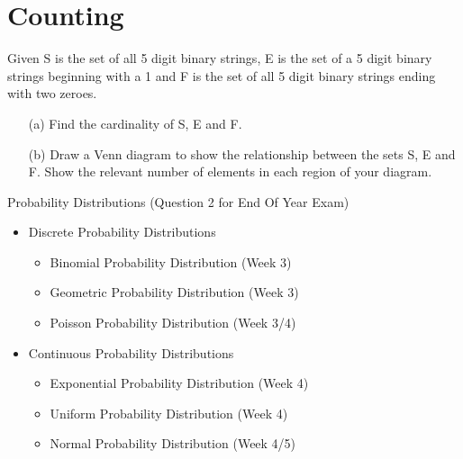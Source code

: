 \documentclass[12pt]{report}
\begin{document}
	
\section{Counting}
Given S is the set of all 5 digit binary strings, E is the set of a 5 digit
binary strings beginning with a 1 and F is the set of all 5 digit binary strings ending
with two zeroes.
\begin{itemize}
	\item[(a)] Find the cardinality of S, E and F.
	\item[(b)] Draw a Venn diagram to show the relationship between the sets S, E and F.
	Show the relevant number of elements in each region of your diagram.
\end{itemize}

{\LARGE
	Probability Distributions (Question 2 for End Of Year Exam)
	\begin{itemize}
		\item Discrete Probability Distributions
		\begin{itemize}
			\item Binomial Probability Distribution (Week 3)
			\item Geometric Probability Distribution (Week 3)
			\item Poisson Probability Distribution (Week 3/4)
		\end{itemize}
		
		\item Continuous Probability Distributions
		\begin{itemize}
			\item Exponential Probability Distribution (Week 4)
			\item Uniform Probability Distribution (Week 4)
			\item Normal Probability Distribution (Week 4/5)
		\end{itemize}
	\end{itemize}
}
\end{document}
